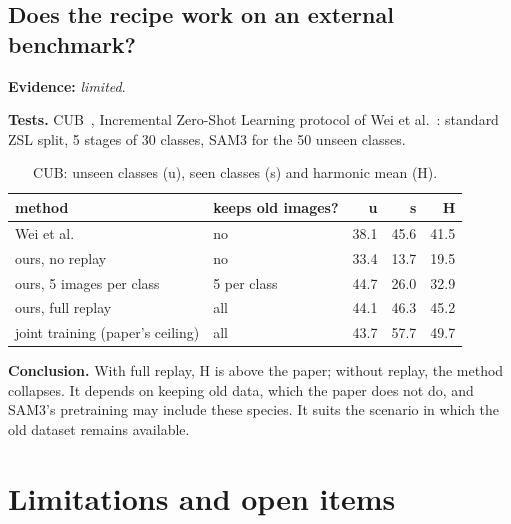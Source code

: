 \documentclass[11pt,a4paper]{article}
\newcommand{\evidence}[1]{\noindent\textbf{Evidence:} \emph{#1}.\par}
\newcommand{\tests}{\noindent\textbf{Tests.} }
\newcommand{\conclusion}{\noindent\textbf{Conclusion.} }
\begin{document}
\subsection{Does the recipe work on an external benchmark?}
\evidence{limited}

\tests CUB~\cite{cub}, Incremental Zero-Shot Learning protocol of Wei et
al.~\cite{izsl}: standard ZSL split, 5 stages of 30 classes, SAM3 for the 50 unseen
classes.

\begin{table}[H]
\centering\small
\caption{CUB: unseen classes (u), seen classes (s) and harmonic mean (H).}
\begin{tabular}{llrrr}
\toprule
method & keeps old images? & u & s & H \\
\midrule
Wei et al. & no & 38.1 & 45.6 & 41.5 \\
ours, no replay & no & 33.4 & 13.7 & 19.5 \\
ours, 5 images per class & 5 per class & 44.7 & 26.0 & 32.9 \\
ours, full replay & all & 44.1 & 46.3 & 45.2 \\
joint training (paper's ceiling) & all & 43.7 & 57.7 & 49.7 \\
\bottomrule
\end{tabular}
\end{table}

\conclusion With full replay, H is above the paper; without replay, the method
collapses. It depends on keeping old data, which the paper does not do, and SAM3's
pretraining may include these species. It suits the scenario in which the old
dataset remains available.

\section{Limitations and open items}
\end{document}
